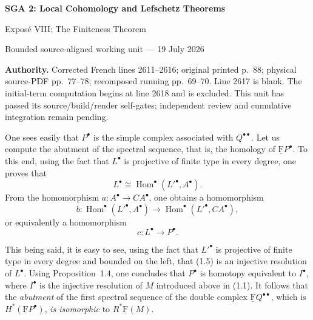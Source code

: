 \documentclass[10pt,a4paper]{article}
\newcommand{\uF}{\underline{\mathrm F}}
\begin{document}
\begin{center}
  {\Large\bfseries SGA 2: Local Cohomology and Lefschetz Theorems}\par\smallskip
  {\large Expos\'e VIII: The Finiteness Theorem}\par
  \small Bounded source-aligned working unit --- 19 July 2026
\end{center}
\noindent\colorbox{softgray}{\parbox{0.95\linewidth}{\footnotesize\textbf{Authority.}
Corrected French lines 2611--2616; original printed p.~88; physical
source-PDF pp.~77--78; recomposed running pp.~69--70. Line 2617 is blank.
The initial-term computation begins at line 2618 and is excluded. This unit
has passed its source/build/render self-gates; independent review and
cumulative integration remain pending.}}

One sees easily that $P^\bullet$ is the simple complex associated with
$Q^{\bullet\bullet}$. Let us compute the abutment of the spectral sequence,
that is, the homology of $\uF P^\bullet$. To this end, using the fact that
$L^\bullet$ is projective of finite type in every degree, one proves that
\[
  L^\bullet \cong \operatorname{Hom}^\bullet({L'}^\bullet,A^\bullet).
\]
From the homomorphism $a\colon A^\bullet\to CA^\bullet$, one obtains a
homomorphism
\[
  b\colon \operatorname{Hom}^\bullet({L'}^\bullet,A^\bullet)
  \longrightarrow \operatorname{Hom}^\bullet({L'}^\bullet,CA^\bullet),
\]
or equivalently a homomorphism
\begin{equation}
  c\colon L^\bullet\longrightarrow P^\bullet.
\end{equation}

This being said, it is easy to see, using the fact that ${L'}^\bullet$ is
projective of finite type in every degree and bounded on the left, that
(1.5) is an injective resolution of $L^\bullet$. Using Proposition~1.4, one
concludes that $P^\bullet$ is homotopy equivalent to $I^\bullet$, where
$I^\bullet$ is the injective resolution of $M$ introduced above in (1.1).
It follows that the \emph{abutment} of the first spectral sequence of the
double complex $\uF Q^{\bullet\bullet}$, which is
$H^*(\uF P^\bullet)$, \emph{is isomorphic} to $R^*\uF(M)$.
\end{document}
